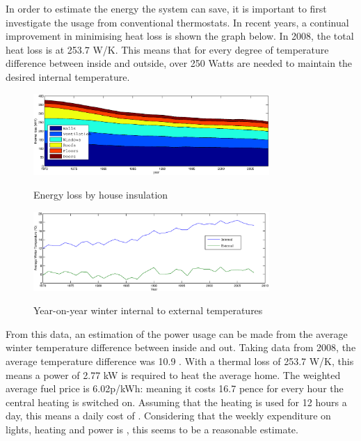 \documentclass[10.5pt,a4paper,twoside]{report}   %
\begin{document}
In order to estimate the energy the system can save, it is important to first investigate the usage from conventional thermostats. In recent years, a continual improvement in minimising heat loss is shown the graph below. In 2008, the total heat loss is at 253.7 W/K. This means that for every degree of temperature difference between inside and outside, over 250 Watts are needed to maintain the desired internal temperature.
\begin{figure}[h!]
  \vspace{-10pt}
  \caption{Energy loss by house insulation}
  \centering
    \includegraphics[width=0.8\textwidth]{images/house_insulation.eps}
\label{fig:houseins}
  \vspace{-10pt}
\end{figure}
\begin{figure}[h!]
  \vspace{-10pt}
  \caption{Year-on-year winter internal to external temperatures}
  \centering
    \includegraphics[width=0.8\textwidth]{images/winter_temperatures.eps}
\label{fig:housetempswint}
  \vspace{-10pt}
\end{figure}
\FloatBarrier
From this data, an estimation of the power usage can be made from the average winter temperature difference between inside and out. Taking data from 2008, the average temperature difference was 10.9 \celsius. With a thermal loss of 253.7 W/K, this means a power of 2.77 kW is required to heat the average home. The weighted average fuel price is 6.02p/kWh: meaning it costs 16.7 pence for every hour the central heating is switched on. Assuming that the heating is used for 12 hours a day, this means a daily cost of  . Considering that the weekly expenditure on lights, heating and power is  , this seems to be a reasonable estimate.
\end{document}
